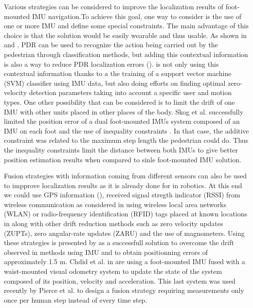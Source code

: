 Various strategies can be considered to improve the localization results of foot-mounted IMU navigation.To achieve this goal, one way to consider is the use of one or more IMU and define some special constraints.
The main advantage of this choice is that the solution would be easily wearable and thus usable.
As shown in \cite{kourogi2010method} and \cite{panahandeh2012chest}, PDR can be used to recognize the action being carried out by the pedestrian through classification methods, but adding this contextual 
information is also a way to reduce PDR localization errors (\cite{kourogi2010method}). \cite{wagstaff2017improving} is not only using this contextual information 
thanks to a the training of a support vector machine (SVM) classifier using IMU data, but also doing efforts on finding optimal zero-velocity detection parameters taking into account 
a specific user and motion types. 
One other possibility that can be considered is to limit the drift of one IMU with other units placed in other places of the body. Skog et al. successfully limited the position error
of a dual foot-mounted IMUs system composed of an IMU on each foot and the use of inequality constraints \cite{skog2012fusing}. In that case, the additive constraint was related to the maximum step length the pedestrian could do.
Thus the inequality constraints limit the distance between both IMUs to give better position estimation results when compared to sinle foot-mounted IMU solution.

Fusion strategies with information coming from different sensors can also be used to impprove localization results as it is already done
for in robotics. At this end we could use GPS information (\cite{sukkarieh1999high,hide2012investigating,gao2014data}), received signal stregth indicator (RSSI) from wireless communication as considered
in \cite{malyavej2013indoor} using wireless local area networks (WLAN) or radio-frequency identification (RFID) tags placed at known locations in \cite{ruiz2012accurate}
along with other drift reduction methods such as zero velocity updates (ZUPTs), zero angular-rate updates (ZARU) and the use of magnometers.
Using these strategies is presented by \cite{ruiz2012accurate} as a successfull solution to overcome the drift observed in methods using IMU and to obtain positionning errors of approximately 1.5 m.
Chdid et al. in \cite{chdid2011inertial} are using a foot-mounted IMU fused with a waist-mounted visual odometry system to update the state of the system composed of its position, velocity and acceleration.
This last system was used recently by Pierce et al. \cite{pierce2016incorporation} to design a fusion strategy requiring measurements only once per human step instead of every time step.

